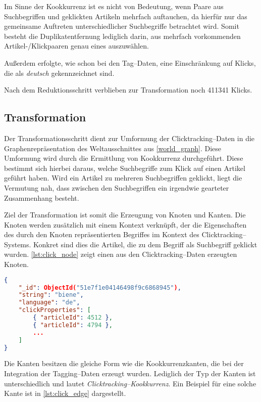 Im Sinne der Kookkurrenz ist es nicht von Bedeutung, wenn Paare aus Suchbegriffen und geklickten Artikeln mehrfach auftauchen, da hierfür nur das gemeinsame Auftreten unterschiedlicher Suchbegriffe betrachtet wird. Somit besteht die Duplikatentfernung lediglich darin, aus mehrfach vorkommenden Artikel-/Klickpaaren genau eines auszuwählen.

Außerdem erfolgte, wie schon bei den Tag--Daten, eine Einschränkung auf Klicks, die als \emph{deutsch} gekennzeichnet sind.

Nach dem Reduktionsschritt verblieben zur Transformation noch \num{411341} Klicks.

\subsection{Transformation}

Der Transformationsschritt dient zur Umformung der Clicktracking--Daten in die Graphenrepräsentation des Weltausschnittes aus \cref{world_graph}. Diese Umformung wird durch die Ermittlung von Kookkurrenz durchgeführt. Diese bestimmt sich hierbei daraus, welche Suchbegriffe zum Klick auf einen Artikel geführt haben. Wird ein Artikel zu mehreren Suchbegriffen geklickt, liegt die Vermutung nah, dass zwischen den Suchbegriffen ein irgendwie gearteter Zusammenhang besteht.

Ziel der Transformation ist somit die Erzeugung von Knoten und Kanten. Die Knoten werden zusätzlich mit einem Kontext verknüpft, der die Eigenschaften des durch den Knoten repräsentierten Begriffes im Kontext des Clicktracking--Systems. Konkret sind dies die Artikel, die zu dem Begriff als Suchbegriff geklickt wurden. \cref{lst:click_node} zeigt einen aus den Clicktracking--Daten erzeugten Knoten.

\begin{lstlisting}[language=json, label={lst:click_node}, caption={JSON--Beispiel für ein aus den Clicktracking--Daten erzeugtes Knotenobjekt}, float]
{
    "_id": ObjectId("51e7f1e04146498f9c6868945"),
    "string": "biene",
    "language": "de",
    "clickProperties": [
        { "articleId": 4512 },
        { "articleId": 4794 },
        ...
    ]
}
\end{lstlisting}

Die Kanten besitzen die gleiche Form wie die Kookkurrenzkanten, die bei der Integration der Tagging--Daten erzeugt wurden. Lediglich der Typ der Kanten ist unterschiedlich und lautet \emph{Clicktracking--Kookkurrenz}. Ein Beispiel für eine solche Kante ist in \cref{lst:click_edge} dargestellt.

